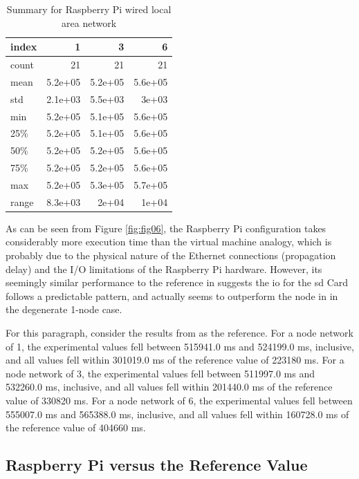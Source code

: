 \begin{table}
\begin{tabular}{lrrr}
\toprule
 index &       1 &       3 &       6 \\
\midrule
 count &      21 &      21 &      21 \\
  mean & 5.2e+05 & 5.2e+05 & 5.6e+05 \\
   std & 2.1e+03 & 5.5e+03 &   3e+03 \\
   min & 5.2e+05 & 5.1e+05 & 5.6e+05 \\
   25\% & 5.2e+05 & 5.1e+05 & 5.6e+05 \\
   50\% & 5.2e+05 & 5.2e+05 & 5.6e+05 \\
   75\% & 5.2e+05 & 5.2e+05 & 5.6e+05 \\
   max & 5.2e+05 & 5.3e+05 & 5.7e+05 \\
 range & 8.3e+03 &   2e+04 &   1e+04 \\
\bottomrule
\end{tabular}
\caption{Summary for Raspberry Pi wired local area network}
\label{table:rp_wired_summary_statistics}
\end{table}

As can be seen from Figure \ref{fig:fig06}, the Raspberry Pi configuration takes considerably more execution time than the virtual machine analogy, which is probably due to the physical nature of the Ethernet connections (propagation delay) and the I/O limitations of the Raspberry Pi hardware.  However, its seemingly similar performance to the reference in \cite{Abramova2014} suggests the \gls{io} for the \gls{sd} Card follows a predictable pattern, and actually seems to outperform the node in \cite{Abramova2014} in the degenerate 1-node case.

For this paragraph, consider the results from \cite{Abramova2014} as the reference.  For a node network of 1, the experimental values fell between 515941.0 ms and 524199.0 ms, inclusive, and all values fell within 301019.0 ms of the reference value of 223180 ms.  For a node network of 3, the experimental values fell between 511997.0 ms and 532260.0 ms, inclusive, and all values fell within 201440.0 ms of the reference value of 330820 ms.  For a node network of 6, the experimental values fell between 555007.0 ms and 565388.0 ms, inclusive, and all values fell within 160728.0 ms of the reference value of 404660 ms.  

\subsection{Raspberry Pi versus the Reference Value}

